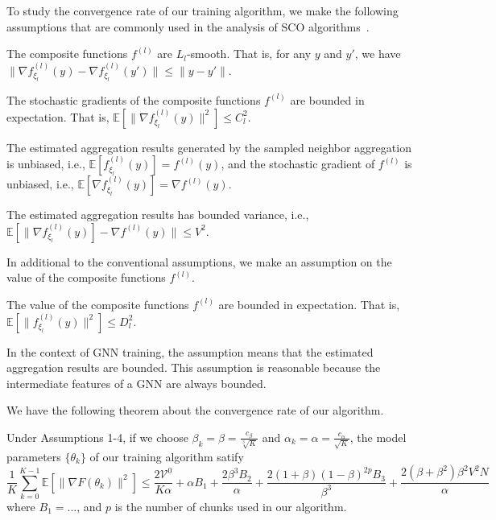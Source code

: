 To study the convergence rate of our training algorithm, 
we make the following assumptions that are commonly used in the analysis of SCO algorithms~\cite{yang2019multilevel, balasubramanian2020stochastic, chen2020solving}. 
\begin{assumption}
  The composite functions $f^{(l)}$ are $L_l$-smooth. That is, for any $y$ and  $y'$, we have $\| \nabla f^{(l)}_{\xi_l}(y)-\nabla f^{(l)}_{\xi_l}(y')\|\leq \|y - y'\|$. 
  \end{assumption}
 \begin{assumption}
    The stochastic gradients of the composite functions $f^{(l)}$ are bounded in expectation. That is, $\mathbb{E}[\| \nabla f^{(l)}_{\xi_l}(y)\|^2]\le C_l^2$.
 \end{assumption}
 \begin{assumption}
  The estimated aggregation results generated by the sampled neighbor aggregation is unbiased, i.e., $\mathbb{E}[f^{(l)}_{\xi_l}(y)]=f^{(l)}(y)$, and the stochastic gradient of $f^{(l)}$ is unbiased, i.e., $\mathbb{E}[\nabla f^{(l)}_{\xi_l}(y)] = \nabla f^{(l)}(y)$. 
\end{assumption}
\begin{assumption}
  The estimated aggregation results has bounded variance, i.e., $\mathbb{E}[\|\nabla f^{(l)}_{\xi_l}(y)] - \nabla f^{(l)}(y)\|\leq V^2$. 
\end{assumption}
In additional to the conventional assumptions, we make an assumption on the value of the composite functions $f^{(l)}$. 
\begin{assumption}
  The value of the composite functions $f^{(l)}$ are bounded in expectation. That is, $\mathbb{E}[\| f^{(l)}_{\xi_l}(y)\|^2]\le D_l^2$.
\end{assumption}
In the context of GNN training, the assumption means that the estimated aggregation results are bounded. 
This assumption is reasonable because the intermediate features of a GNN are always bounded. 

We have the following theorem about the convergence rate of our algorithm. 
\begin{theorem}
  Under Assumptions 1-4, if we choose $\beta_k=\beta=\frac{c_\beta}{\sqrt[3]{K}}$ and $\alpha_k=\alpha=\frac{c_\alpha}{\sqrt{K}}$, the model parameters $\{\theta_k\}$ of our training algorithm satify
\begin{equation}
  \frac{1}{K}\sum_{k=0}^{K-1}\mathbb{E}[\|\nabla F(\theta_k)\|^2] \leq \frac{2\mathcal{V}^0}{K\alpha} + \alpha B_1 + \frac{2\beta^3 B_2}{\alpha} + \frac{2(1+\beta)(1-\beta)^{2p}B_3}{\beta^3} + \frac{2(\beta+\beta^2)\beta^2V^2N}{\alpha}
\end{equation}
where $B_1=...$, and $p$ is the number of chunks used in our algorithm. 
\end{theorem}
















